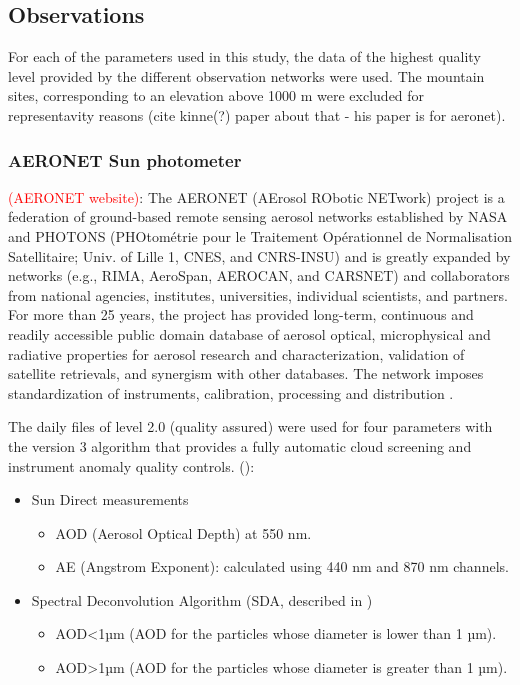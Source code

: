\documentclass[journal abbreviation, manuscript]{copernicus}
\begin{document}
\subsection{Observations}

For each of the parameters used in this study, the data of the highest quality level provided by the different observation networks were used. The mountain sites, corresponding to an elevation above 1000 m were excluded for representavity reasons (cite kinne(?) paper about that - his paper is for aeronet).

\subsubsection{AERONET Sun photometer}
\textcolor{red}{(AERONET website)}: The AERONET (AErosol RObotic NETwork) project is a federation of ground-based remote sensing aerosol networks established by NASA and PHOTONS (PHOtométrie pour le Traitement Opérationnel de Normalisation Satellitaire; Univ. of Lille 1, CNES, and CNRS-INSU) and is greatly expanded by networks (e.g., RIMA, AeroSpan, AEROCAN, and CARSNET) and collaborators from national agencies, institutes, universities, individual scientists, and partners. For more than 25 years, the project has provided long-term, continuous and readily accessible public domain database of aerosol optical, microphysical and radiative properties for aerosol research and characterization, validation of satellite retrievals, and synergism with other databases. The network imposes standardization of instruments, calibration, processing and distribution \cite{holben2001emerging}.

The daily files of level 2.0 (quality assured) were used for four parameters with the version 3 algorithm that provides a fully automatic cloud screening and instrument anomaly quality controls. (\cite{smirnov2000cloud,smirnov2004aeronet,giles2019advancements}):

\begin{itemize}
 \item Sun Direct measurements
       \begin{itemize}
        \item AOD (Aerosol Optical Depth) at 550 nm.
        \item AE (Angstrom Exponent): calculated using 440 nm and 870 nm channels.
       \end{itemize}
 \item Spectral Deconvolution Algorithm (SDA, described in \cite{o2003spectral})
       \begin{itemize}
        \item AOD<1µm (AOD for the particles whose diameter is lower than 1 µm).
        \item AOD>1µm (AOD for the particles whose diameter is greater than 1 µm).
       \end{itemize}
\end{itemize}
\end{document}
